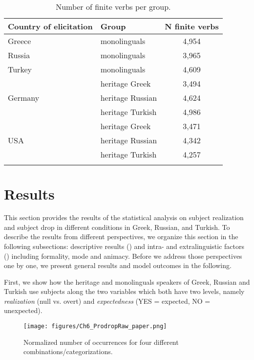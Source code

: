 \documentclass[output=paper,colorlinks,citecolor=brown]{langscibook}
\begin{document}
\begin{table}
\begin{tabular}{llc}
  \lsptoprule
 Country of elicitation & Group & N finite verbs \\ 
  \midrule
  Greece & monolinguals & 4,954 \\ 
  Russia & monolinguals & 3,965 \\ 
  Turkey & monolinguals & 4,609 \\ \midrule
   & heritage Greek & 3,494 \\ 
  Germany & heritage Russian & 4,624 \\ 
   & heritage Turkish & 4,986 \\ \midrule
 & heritage Greek & 3,471 \\ 
 USA & heritage Russian & 4,342 \\ 
  & heritage Turkish & 4,257 \\
   \lspbottomrule
\end{tabular}
\caption{Number of finite verbs per group.}
\label{tab:oezsoy:ProDrop:NormTable}
\end{table}

\section{Results} \label{sec:oezsoy:6Results}

This section provides the results of the statistical analysis on subject realization and subject drop in different conditions in Greek, Russian, and Turkish. 
To describe the results from different perspectives, we organize this section in the following subsections: descriptive results () and intra- and extralinguistic factors () including formality, mode and animacy. 
Before we address those perspectives one by one, we present general results and model outcomes in the following. 

First, we show how the heritage and monolinguals speakers of Greek, Russian and Turkish use subjects along the two variables which both have two levels, namely \textit{realization} (null vs. overt) and \textit{expectedness} (YES = expected, NO = unexpected). 

\begin{figure}[ht]
    \centering
    \texttt{[image: figures/Ch6\_ProdropRaw\_paper.png]}
    \caption{Normalized number of occurrences for four different combinations/categorizations.}
    \label{fig:oezsoy:ProDropRaw}
\end{figure}
\end{document}
